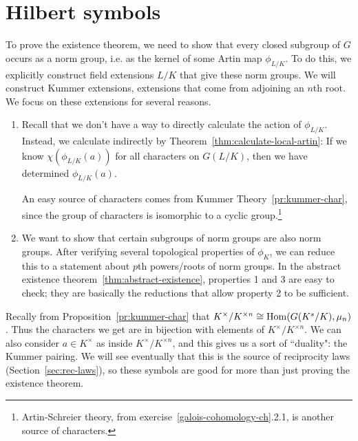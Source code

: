 \section{Hilbert symbols}
To prove the existence theorem, we need to show that every closed subgroup of $G$ occurs as a norm group, i.e. as the kernel of some Artin map $\phi_{L/K}$. To do this, we explicitly construct field extensions $L/K$ that give these norm groups. We will construct Kummer extensions, extensions that come from adjoining an $n$th root. We focus on these extensions for several reasons.
\begin{enumerate}
\item Recall that we don't have a way to directly calculate the action of $\phi_{L/K}$. Instead, we calculate indirectly by Theorem~\ref{thm:calculate-local-artin}: If we know $\chi(\phi_{L/K}(a))$ for all characters on $G(L/K)$, then we have determined $\phi_{L/K}(a)$.

An easy source of characters comes from Kummer Theory~\ref{pr:kummer-char}, since the group of characters is isomorphic to a cyclic group.\footnote{Artin-Schreier theory, from exercise~\ref{galois-cohomology-ch}.2.1, is another source of characters.}
\item We want to show that certain subgroups of norm groups are also norm groups. After verifying several topological properties of $\phi_{K}$, we can reduce this to a statement about $p$th powers/roots of norm groups. In the abstract existence theorem~\ref{thm:abstract-existence}, properties 1 and 3 are easy to check; they are basically the reductions that allow property 2 to be sufficient.
\end{enumerate}
Recally from Proposition~\ref{pr:kummer-char} that $K^{\times}/K^{\times n}\cong \operatorname{Hom}(G(K^s/K),\mu_n)$. Thus the characters we get are in bijection with elements of $K^{\times}/K^{\times n}$. We can also consider $a\in K^{\times}$ as inside $K^{\times}/K^{\times n}$, and this gives us a sort of ``duality": the Kummer pairing. We will see eventually that this is the source of reciprocity laws (Section~\ref{sec:rec-laws}), so these symbols are good for more than just proving the existence theorem.

